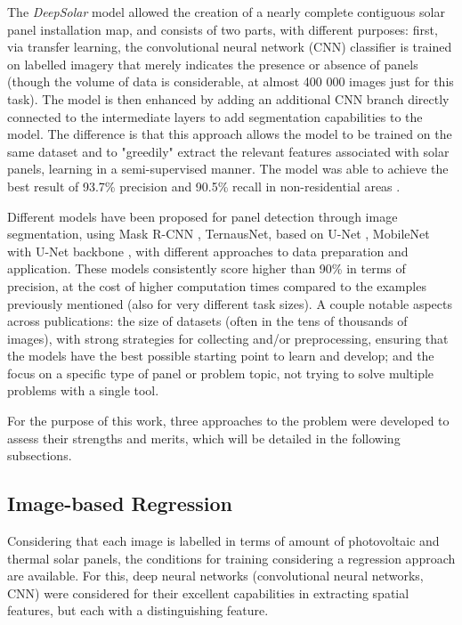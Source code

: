 \documentclass[conference]{IEEEtran}
\begin{document}
The \textit{DeepSolar} model allowed the creation of a nearly complete contiguous solar panel installation map, and consists of two parts, with different purposes: first, via transfer learning, the convolutional neural network (CNN) classifier is trained on labelled imagery that merely indicates the presence or absence of panels (though the volume of data is considerable, at almost 400 000 images just for this task). The model is then enhanced by adding an additional CNN branch directly connected to the intermediate layers to add segmentation capabilities to the model. The difference is that this approach allows the model to be trained on the same dataset and to "greedily" extract the relevant features associated with solar panels, learning in a semi-supervised manner. The model was able to achieve the best result of 93.7\% precision and 90.5\% recall in non-residential areas \cite{Yu2018DeepSolar}.

Different models have been proposed for panel detection through image segmentation, using Mask R-CNN \cite{maskrcnn} , TernausNet, based on U-Net \cite{KAUSIKA2021100111}, MobileNet with U-Net backbone \cite{wani2021segmentation}, with different approaches to data preparation and application. These models consistently score higher than 90\% in terms of precision, at the cost of higher computation times compared to the examples previously mentioned (also for very different task sizes). A couple notable aspects across publications: the size of datasets (often in the tens of thousands of images), with strong strategies for collecting and/or preprocessing, ensuring that the models have the best possible starting point to learn and develop; and the focus on a specific type of panel or problem topic, not trying to solve multiple problems with a single tool.

For the purpose of this work, three approaches to the problem were developed to assess their strengths and merits, which will be detailed in the following subsections.

\subsection{Image-based Regression}

Considering that each image is labelled in terms of amount of photovoltaic and thermal solar panels, the conditions for training considering a regression approach are available. For this, deep neural networks (convolutional neural networks, CNN) were considered for their excellent capabilities in extracting spatial features, but each with a distinguishing feature.
\end{document}
